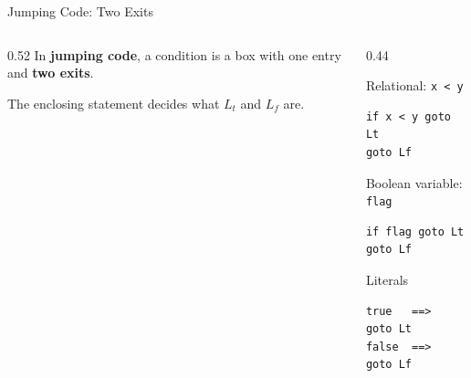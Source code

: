 \documentclass[aspectratio=169,11pt,xcolor=table]{beamer}
\newcommand{\tc}[1]{\texttt{#1}}
\begin{document}
\begin{frame}[fragile]{Jumping Code: Two Exits}
  \begin{columns}[T]
    \begin{column}{0.52\textwidth}
In \textbf{jumping code}, a condition is
      a box with one entry and \textbf{two exits}.
      \begin{center}
      \end{center}
      The enclosing statement decides what $L_t$ and $L_f$ are.
    \end{column}
    \begin{column}{0.44\textwidth}
      \begin{block}{Relational: \tc{x < y}}
        \begin{verbatim}
if x < y goto Lt
goto Lf
        \end{verbatim}
      \end{block}
      \begin{block}{Boolean variable: \tc{flag}}
        \begin{verbatim}
if flag goto Lt
goto Lf
        \end{verbatim}
      \end{block}
      \begin{block}{Literals}
        \begin{verbatim}
true   ==>  goto Lt
false  ==>  goto Lf
        \end{verbatim}
      \end{block}
    \end{column}
  \end{columns}
\end{frame}
\end{document}
